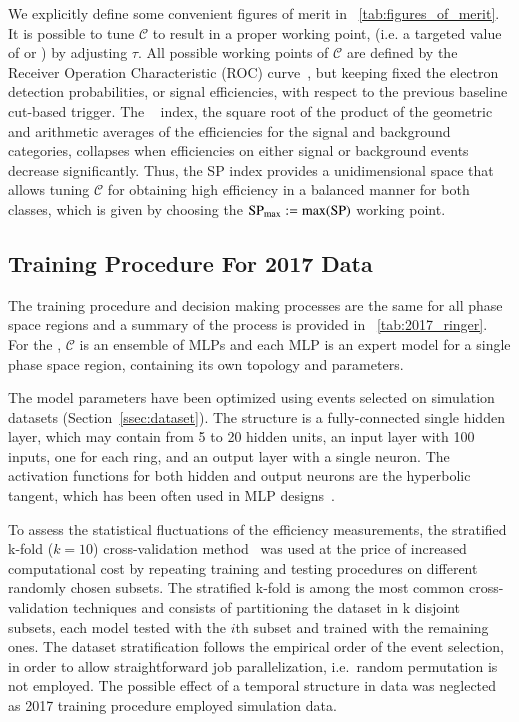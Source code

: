 We explicitly define some convenient figures of merit in \tablename~\ref{tab:figures_of_merit}. It is possible to tune $\mathcal{C}$ to result in a proper working point, (i.e. a targeted value of \pd{} or \pf{}) by adjusting $\tau$. All possible working points of $\mathcal{C}$ are defined by the Receiver Operation Characteristic (ROC) curve~\cite{van_trees_part1}, but keeping fixed the electron detection probabilities, or signal efficiencies, with respect to the previous baseline cut-based trigger. The \spindex{}~\cite{dos2006neural} index, the square root of the product of the geometric and arithmetic averages of the efficiencies for the signal and background categories, collapses when efficiencies on either signal or background events decrease significantly. Thus, the SP index provides a unidimensional space that allows tuning $\mathcal{C}$ for obtaining high efficiency in a balanced manner for both classes, which is given by choosing the $\text{SP}_{\text{max}}{}:=\max(\text{SP}{})$ working point.











\subsection{Training Procedure For 2017 Data}\label{ssec:2017}

The training procedure and decision making processes are the same for all phase
space regions and a summary of the process is provided in
\tablename~\ref{tab:2017_ringer}. For the \rnn{}, $\mathcal{C}$ is an ensemble of
MLPs and each MLP is an expert model for a single phase space
region, containing its own topology and parameters.

The model parameters have been optimized using events selected on simulation datasets
(Section~\ref{ssec:dataset}). The structure is a fully-connected single
hidden layer, which may contain from 5 to 20 hidden units, an input layer with 100 inputs, one for each ring, and an output layer with a single neuron. The activation
functions for both hidden and output neurons are the hyperbolic tangent, which has been often used in MLP designs~\cite{haykin_2008}. 

To assess the statistical fluctuations of the efficiency measurements, the stratified k-fold ($k=10$) cross-validation method~\cite{haykin_2008} was used at the price of increased computational cost by repeating training and testing procedures on different
randomly chosen subsets. The stratified k-fold is
among the most common cross-validation techniques and consists of partitioning
the dataset in k disjoint subsets, each model tested with the $i$th subset and
trained with the remaining ones. The dataset stratification follows the
empirical order of the event selection, in order to allow straightforward job
parallelization, i.e.\ random permutation is not employed. The possible effect
of a temporal structure in data was neglected as 2017 training procedure
employed simulation data.

